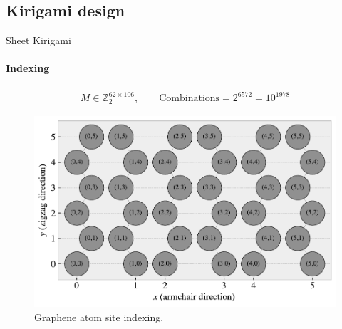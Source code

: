 \documentclass[
	10pt, %
]{beamer}
\begin{document}
\subsection{Kirigami design}
\begin{frame}{Sheet Kirigami}
	\framesubtitle{Indexing}
	\begin{align*}
		M \in \mathbb{Z}_2^{62 \times 106}, \qquad \text{Combinations} = 2^{6572} = 10^{1978}
	\end{align*}
	\begin{figure}[H]
		\centering
		\includegraphics[width=0.7\linewidth]{../thesis/figures/system/atom_indexing.pdf}
		\caption{Graphene atom site indexing.}
	\end{figure}	
\end{frame}
%
%
%
%
\end{document}
